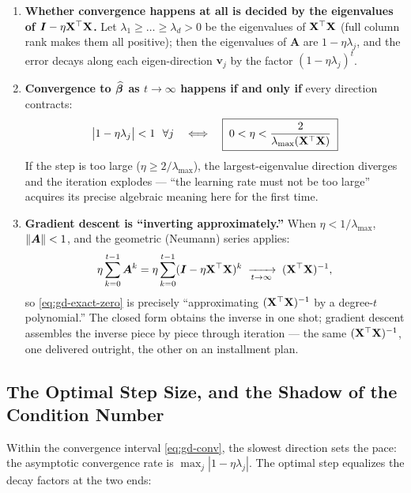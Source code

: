 \begin{enumerate}[label=(\arabic*)]
  \item \textbf{Whether convergence happens at all is decided by the eigenvalues of $\bm{I} - \eta\mathbf{X}^\top\mathbf{X}$.} Let $\lambda_1 \ge \dots \ge \lambda_d > 0$ be the eigenvalues of $\mathbf{X}^\top\mathbf{X}$ (full column rank makes them all positive); then the eigenvalues of $\bm{A}$ are $1 - \eta \lambda_j$, and the error decays along each eigen-direction $\bm{v}_j$ by the factor $(1 - \eta\lambda_j)^t$.
  \item \textbf{Convergence to $\widehat{\bm{\beta}}$ as $t \to \infty$ happens if and only if} every direction contracts:
  \begin{equation}\label{eq:gd-conv}
    \big| 1 - \eta \lambda_j \big| < 1 \ \ \forall j
    \quad\Longleftrightarrow\quad
    \boxed{\;0 < \eta < \frac{2}{\lambda_{\max}(\mathbf{X}^\top\mathbf{X})}\;}
  \end{equation}
  If the step is too large ($\eta \ge 2/\lambda_{\max}$), the largest-eigenvalue direction diverges and the iteration explodes — ``the learning rate must not be too large'' acquires its precise algebraic meaning here for the first time.
  \item \textbf{Gradient descent is ``inverting approximately.''} When $\eta < 1/\lambda_{\max}$, $\left\lVert \bm{A} \right\rVert < 1$, and the geometric (Neumann) series applies:
  \[
    \eta \sum_{k=0}^{t-1} \bm{A}^k = \eta \sum_{k=0}^{t-1} (\bm{I} - \eta \mathbf{X}^\top \mathbf{X})^k
    \;\xrightarrow[t \to \infty]{}\; (\mathbf{X}^\top \mathbf{X})^{-1},
  \]
  so \eqref{eq:gd-exact-zero} is precisely ``approximating $(\mathbf{X}^\top\mathbf{X})^{-1}$ by a degree-$t$ polynomial.'' The closed form obtains the inverse in one shot; gradient descent assembles the inverse piece by piece through iteration — the same $(\mathbf{X}^\top\mathbf{X})^{-1}$, one delivered outright, the other on an installment plan.
\end{enumerate}

\subsection{The Optimal Step Size, and the Shadow of the Condition Number}\label{sec:gd-rate}

Within the convergence interval \eqref{eq:gd-conv}, the slowest direction sets the pace: the asymptotic convergence rate is $\max_j |1 - \eta \lambda_j|$. The optimal step equalizes the decay factors at the two ends:

